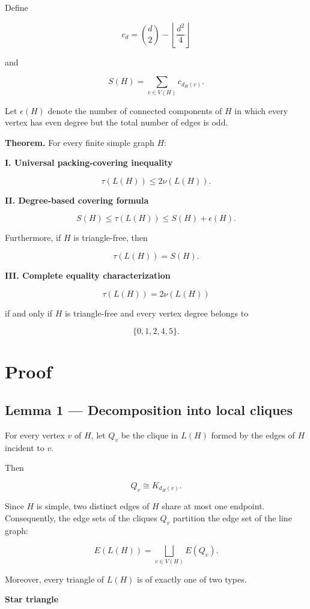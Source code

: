 \documentclass[11pt]{article}
\begin{document}
Define

\[
c_d=\binom d2-\left\lfloor\frac{d^2}{4}\right\rfloor
\]

and

\[
S(H)=\sum_{v\in V(H)}c_{d_H(v)}.
\]

Let \(\epsilon(H)\) denote the number of connected components of \(H\) in which every vertex has even degree but the total number of edges is odd.

\textbf{Theorem.} For every finite simple graph \(H\):

\textbf{I. Universal packing-covering inequality}

\[
\boxed{\tau(L(H))\leq2\nu(L(H)).}
\]

\textbf{II. Degree-based covering formula}

\[
\boxed{S(H)\leq\tau(L(H))
\leq S(H)+\epsilon(H).}
\]

Furthermore, if \(H\) is triangle-free, then

\[
\boxed{\tau(L(H))=S(H).}
\]

\textbf{III. Complete equality characterization}

\[
\boxed{
\tau(L(H))=2\nu(L(H))
}
\]

if and only if \(H\) is triangle-free and every vertex degree belongs to

\[
\boxed{\{0,1,2,4,5\}.}
\]

\section{Proof}

\subsection{Lemma 1 --- Decomposition into local cliques}

For every vertex \(v\) of \(H\), let \(Q_v\) be the clique in \(L(H)\) formed by the edges of \(H\) incident to \(v\).

Then

\[
Q_v\cong K_{d_H(v)}.
\]

Since \(H\) is simple, two distinct edges of \(H\) share at most one endpoint. Consequently, the edge sets of the cliques \(Q_v\) partition the edge set of the line graph:

\[
E(L(H))=\bigsqcup_{v\in V(H)}E(Q_v).
\]

Moreover, every triangle of \(L(H)\) is of exactly one of two types.

\textbf{Star triangle}
\end{document}
